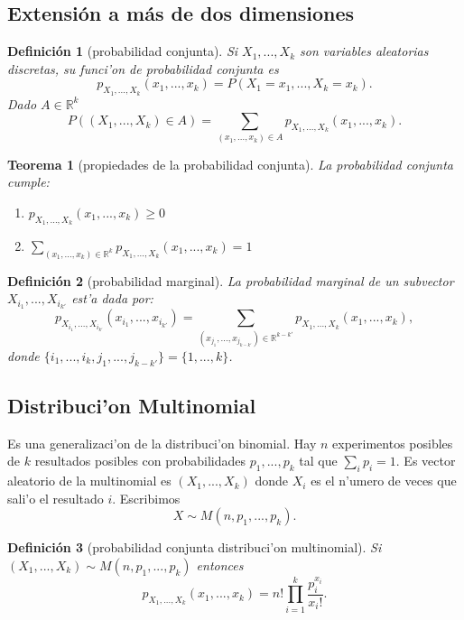 \documentclass[a4paper,spanish]{article}
\newcommand{\R}[0]{\mathbb{R}}
\newtheorem{teo}{Teorema}
\newtheorem{defi}{Definici\'on}
\begin{document}
\subsection{Extensi\'on a m\'as de dos dimensiones}

\begin{defi}[probabilidad conjunta]
Si $X_1,...,X_k$ son variables aleatorias discretas, su \emph{funci'on de
probabilidad conjunta} es 
$$p_{X_1,...,X_k}(x_1,...,x_k) = P(X_1 = x_1,...,X_k = x_k).$$
Dado $A \in \R^k$ 
$$P((X_1,...,X_k) \in A) = 
	\sum_{(x_1,...,x_k) \in A} p_{X_1,...,X_k}(x_1,...,x_k).$$
\end{defi}

\begin{teo}[propiedades de la probabilidad conjunta]
La probabilidad conjunta cumple:
\begin{enumerate}
\item $p_{X_1,...,X_k}(x_1,...,x_k) \geq 0$
\item $\sum_{(x_1,...,x_k) \in \R^k} p_{X_1,...,X_k}(x_1,...,x_k) = 1$
\end{enumerate}
\end{teo}

\begin{defi}[probabilidad marginal]
La \emph{probabilidad marginal} de un subvector $X_{i_1},...,X_{i_{k'}}$
est'a dada por:
$$p_{X_{i_1},...,X_{i_{k'}}}(x_{i_1},...,x_{i_{k'}}) = 
	\sum_{(x_{j_1},...,x_{j_{k-k'}}) \in \R^{k-k'}} 
		p_{X_1,...,X_k}(x_1,...,x_k),$$
donde $\{i_1,...,i_k,j_1,...,j_{k-k'}\} = \{1,...,k\}$.
\end{defi}

\subsection{Distribuci'on Multinomial}

Es una generalizaci'on de la distribuci'on binomial. Hay $n$ experimentos
posibles de $k$ resultados posibles con probabilidades $p_1,...,p_k$ tal que
$\sum_i p_i = 1$. Es vector aleatorio de la multinomial es $(X_1,...,X_k)$
donde $X_i$ es el n'umero de veces que sali'o el resultado $i$. Escribimos 
$$X \sim M(n,p_1,...,p_k).$$

\begin{defi}[probabilidad conjunta distribuci'on multinomial]
Si $(X_1,...,X_k) \sim M(n,p_1,...,p_k)$ entonces
$$p_{X_1,...,X_k}(x_1,...,x_k) = n! \prod_{i=1}^k \frac{p_i^{x_i}}{x_i!}.$$
\end{defi}
\end{document}
